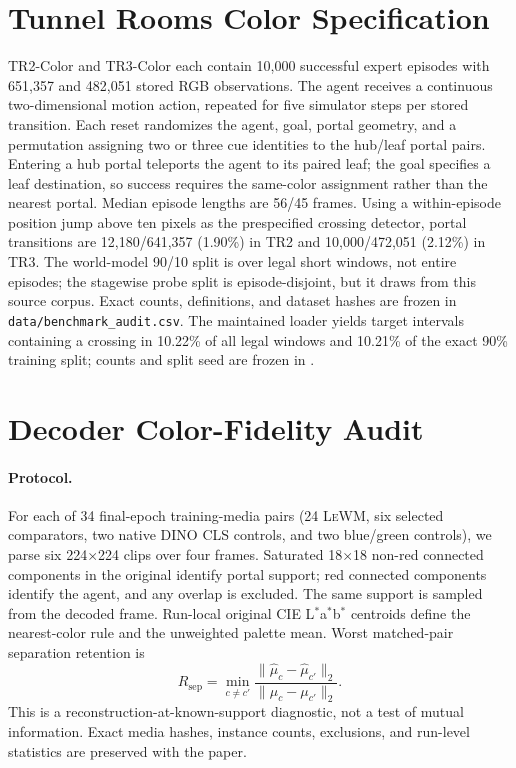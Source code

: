 \documentclass{article}
\newcommand{\lewm}{\textsc{LeWM}}
\begin{document}
\section{Tunnel Rooms Color Specification}

TR2-Color and TR3-Color each contain 10,000 successful expert episodes with
651,357 and 482,051 stored RGB observations.  The agent receives a continuous
two-dimensional motion action, repeated for five simulator steps per stored
transition.  Each reset randomizes the agent, goal, portal geometry, and a
permutation assigning two or three cue identities to the hub/leaf portal
pairs.  Entering a hub portal teleports the agent to its paired leaf; the goal
specifies a leaf destination, so success requires the same-color assignment
rather than the nearest portal.  Median episode lengths are 56/45 frames.
Using a within-episode position jump above ten pixels as the prespecified
crossing detector, portal transitions are 12,180/641,357 (1.90\%) in TR2 and
10,000/472,051 (2.12\%) in TR3.  The world-model 90/10 split is over legal
short windows, not entire episodes; the stagewise probe split is
episode-disjoint, but it draws from this source corpus.  Exact counts,
definitions, and dataset hashes are frozen in
\texttt{data/benchmark\_audit.csv}.  The maintained loader yields target
intervals containing a crossing in 10.22\% of all legal windows and 10.21\% of
the exact 90\% training split; counts and split seed are frozen in
.

\section{Decoder Color-Fidelity Audit}

\paragraph{Protocol.}
For each of 34 final-epoch training-media pairs (24 \lewm{}, six selected
comparators, two native DINO CLS controls, and two blue/green controls), we
parse six 224$\times$224 clips over four
frames.  Saturated 18$\times$18 non-red connected components in the original
identify portal support; red connected components identify the agent, and any
overlap is excluded.  The same support is sampled from the decoded frame.
Run-local original CIE L$^*$a$^*$b$^*$ centroids define the nearest-color rule
and the unweighted palette mean.  Worst matched-pair separation retention is
\begin{equation}
 R_{\mathrm{sep}}=
 \min_{c\ne c'}
 \frac{\|\hat\mu_c-\hat\mu_{c'}\|_2}
      {\|\mu_c-\mu_{c'}\|_2}.
 \end{equation}
This is a reconstruction-at-known-support diagnostic, not a test of mutual
information.  Exact media hashes, instance counts, exclusions, and run-level
statistics are preserved with the paper.
\end{document}
